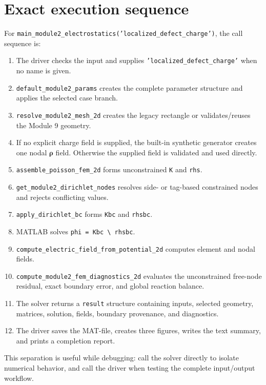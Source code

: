 \documentclass[11pt]{article}
\begin{document}
\section{Exact execution sequence}

For \texttt{main\_module2\_electrostatics('localized\_defect\_charge')}, the call sequence is:
\begin{enumerate}[leftmargin=*]
  \item The driver checks the input and supplies \texttt{'localized\_defect\_charge'} when no name is given.
  \item \texttt{default\_module2\_params} creates the complete parameter structure and applies the selected case branch.
  \item \texttt{resolve\_module2\_mesh\_2d} creates the legacy rectangle or validates/reuses the Module 9 geometry.
  \item If no explicit charge field is supplied, the built-in synthetic generator creates one nodal $\bm{\rho}$ field. Otherwise the supplied field is validated and used directly.
  \item \texttt{assemble\_poisson\_fem\_2d} forms unconstrained \texttt{K} and \texttt{rhs}.
  \item \texttt{get\_module2\_dirichlet\_nodes} resolves side- or tag-based constrained nodes and rejects conflicting values.
  \item \texttt{apply\_dirichlet\_bc} forms \texttt{Kbc} and \texttt{rhsbc}.
  \item MATLAB solves \texttt{phi = Kbc \textbackslash{} rhsbc}.
  \item \texttt{compute\_electric\_field\_from\_potential\_2d} computes element and nodal fields.
  \item \texttt{compute\_module2\_fem\_diagnostics\_2d} evaluates the unconstrained free-node residual, exact boundary error, and global reaction balance.
  \item The solver returns a \texttt{result} structure containing inputs, selected geometry, matrices, solution, fields, boundary provenance, and diagnostics.
  \item The driver saves the MAT-file, creates three figures, writes the text summary, and prints a completion report.
\end{enumerate}

This separation is useful while debugging: call the solver directly to isolate numerical behavior, and call the driver when testing the complete input/output workflow.
\end{document}
